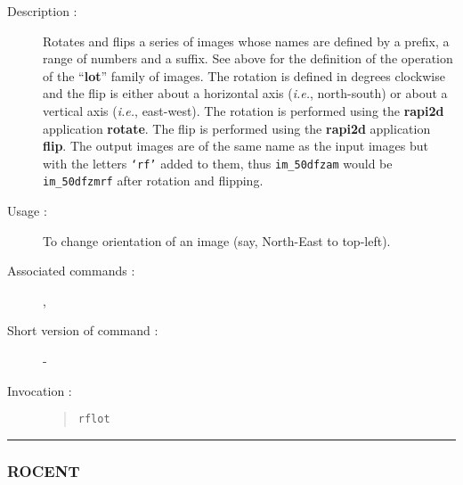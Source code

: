 \begin{description}

\item[Description :] Rotates and flips a series of images whose names
are defined by a prefix, a range of numbers and a suffix. See above for
the definition of the operation of the ``{\bf lot}'' family of images.
The rotation is defined in degrees clockwise and the flip is either
about a horizontal axis (\emph{i.e.}, north-south) or about a vertical
axis (\emph{i.e.}, east-west).  The rotation is performed using the
{\bf rapi2d} application {\bf rotate}.  The flip is performed using the
{\bf rapi2d} application {\bf flip}.  The output images are of the same
name as the input images but with the letters {\tt `rf'} added to them,
thus {\tt im\_50dfzam} would be {\tt im\_50dfzmrf} after rotation and
flipping.

\item[Usage :] To change orientation of an image (say, North-East to top-left).
\item[Associated commands :] {\tt {}},
{\tt {}}
\item[Short version of command :] -
\item[Invocation :]

\begin{quote}{\tt  rflot }\end{quote}

\end{description}

\hrule
\subsubsection*{\label{ROCENT}ROCENT}

